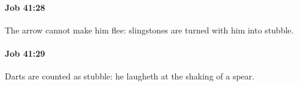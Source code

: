 		\paragraph{Job 41:28} %
			\label{JOB-41-28}

			The arrow cannot make him flee: slingstones are turned with him into stubble.


		\paragraph{Job 41:29} %
			\label{JOB-41-29}

			Darts are counted as stubble: he laugheth at the shaking of a spear.


